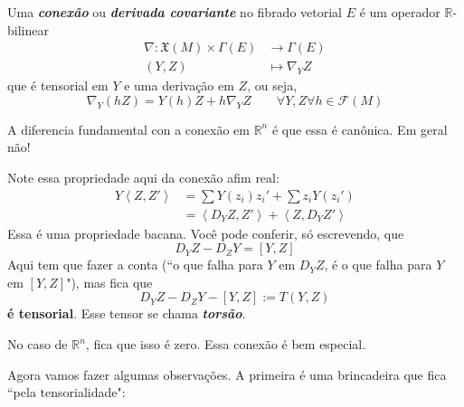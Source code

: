 \begin{defn}\leavevmode
Uma \textit{\textbf{conexão}} ou \textit{\textbf{derivada covariante}} no fibrado vetorial \(E\) é um operador \(\mathbb{R}\)-bilinear
\begin{align*}
	\nabla: \mathfrak{X}(M) \times \Gamma(E) &\longrightarrow \Gamma(E) \\
	(Y,Z) &\longmapsto \nabla_YZ
\end{align*}
que é tensorial em \(Y\) e uma derivação em \(Z\), ou seja,
\[\nabla_Y(hZ)=Y(h)Z+h\nabla_YZ\qquad  \forall  Y,Z \forall h \in \mathcal{F}(M)\]
\end{defn}

A diferencia fundamental con a conexão em \(\mathbb{R}^n\) é que essa é canônica. Em geral não!

Note essa propriedade aqui da conexão afim real:
\begin{align*}
Y\left<Z,Z'\right>&=\sum Y(z_i)z_i'+\sum z_i Y(z_i')\\
&=\left<D_YZ,Z'\right>+\left<Z,D_YZ'\right>
\end{align*}
Essa é uma propriedade bacana. Você pode conferir, só escrevendo, que
\[D_YZ-D_ZY=[Y,Z]\]
Aqui tem que fazer a conta (``o que falha para \(Y\) em  \(D_YZ\),  é o que falha para \(Y\) em \([Y,Z]\)"), mas fica que
\[D_YZ-D_ZY-[Y,Z]:=T(Y,Z)\]
\textbf{é tensorial}. Esse tensor se chama \textit{\textbf{torsão}}.

No caso de \(\mathbb{R}^n\), fica que isso é zero. Essa conexão é bem especial.

Agora vamos fazer algumas observações. A primeira é uma brincadeira que fica ``pela tensorialidade":

